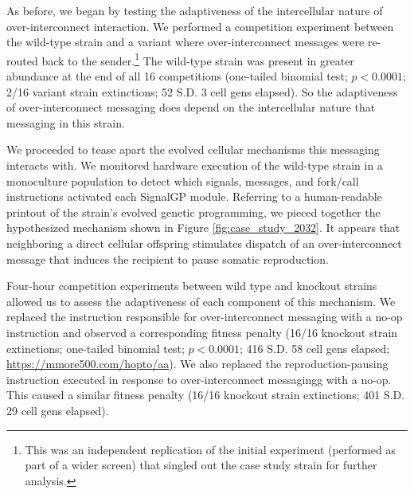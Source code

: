 
As before, we began by testing the adaptiveness of the intercellular nature of over-interconnect interaction.
We performed a competition experiment between the wild-type strain and a variant where over-interconnect messages were re-routed back to the sender.\footnote{
This was an independent replication of the initial experiment (performed as part of a wider screen) that singled out the case study strain for further analysis.
}
The wild-type strain was present in greater abundance at the end of all 16 competitions (one-tailed binomial test; $p < 0.0001$; 2/16 variant strain extinctions; 52 S.D. 3 cell gens elapsed).
So the adaptiveness of over-interconnect messaging does depend on the intercellular nature that messaging in this strain.

We proceeded to tease apart the evolved cellular mechanisms this messaging interacts with.
We monitored hardware execution of the wild-type strain in a monoculture population to detect which signals, messages, and fork/call instructions activated each SignalGP module.
Referring to a human-readable printout of the strain's evolved genetic programming, we pieced together the hypothesized mechanism shown in Figure \ref{fig:case_study_2032}.
It appears that neighboring a direct cellular offspring stimulates dispatch of an over-interconnect message that induces the recipient to pause somatic reproduction.

Four-hour competition experiments between wild type and knockout strains allowed us to assess the adaptiveness of each component of this mechanism.
We replaced the instruction responsible for over-interconnect messaging with a no-op instruction and observed a corresponding fitness penalty (16/16 knockout strain extinctions; one-tailed binomial test; $p < 0.0001$; 416 S.D. 58 cell gens elapsed; \url{https://mmore500.com/hopto/aa}).
We also replaced the reproduction-pausing instruction executed in response to over-interconnect messagingg with a no-op.
This caused a similar fitness penalty (16/16 knockout strain extinctions; 401 S.D. 29 cell gens elapsed).

